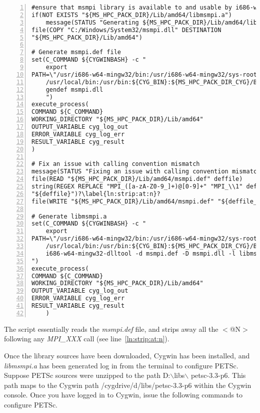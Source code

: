 \documentclass[10pt,a4paper]{article}
\newcommand{\bs}{\ensuremath{\backslash}}
\begin{document}
\begin{codeparchment}
\begin{lstlisting}[numbers=left]
#ensure that msmpi library is available to and usable by i686-w64-mingw32-gcc
if(NOT EXISTS "${MS_HPC_PACK_DIR}/Lib/amd64/libmsmpi.a")
  	message(STATUS "Generating ${MS_HPC_PACK_DIR}/Lib/amd64/libmsmpi.a")
file(COPY "C:/Windows/System32/msmpi.dll" DESTINATION
"${MS_HPC_PACK_DIR}/Lib/amd64")

# Generate msmpi.def file
set(C_COMMAND ${CYGWINBASH} -c "
	export
PATH=\"/usr/i686-w64-mingw32/bin:/usr/i686-w64-mingw32/sys-root/mingw/bin:
	/usr/local/bin:/usr/bin:${CYG_BIN}:${MS_HPC_PACK_DIR_CYG}/Bin:$PATH\"
	gendef msmpi.dll
	")
execute_process(
COMMAND ${C_COMMAND}
WORKING_DIRECTORY "${MS_HPC_PACK_DIR}/Lib/amd64"
OUTPUT_VARIABLE cyg_log_out 
ERROR_VARIABLE cyg_log_err 
RESULT_VARIABLE cyg_result
)

# Fix an issue with calling convention mismatch
message(STATUS "Fixing an issue with calling convention mismatch")
file(READ "${MS_HPC_PACK_DIR}/Lib/amd64/msmpi.def" deffile)
string(REGEX REPLACE "MPI_([a-zA-Z0-9_]+)@[0-9]+" "MPI_\\1" deffile_patch
"${deffile}")?\label{ln:strip:at:n}?	
file(WRITE "${MS_HPC_PACK_DIR}/Lib/amd64/msmpi.def" "${deffile_patch}")

# Generate libmsmpi.a
set(C_COMMAND ${CYGWINBASH} -c "
	export
PATH=\"/usr/i686-w64-mingw32/bin:/usr/i686-w64-mingw32/sys-root/mingw/bin:
	/usr/local/bin:/usr/bin:${CYG_BIN}:${MS_HPC_PACK_DIR_CYG}/Bin:$PATH\"
	i686-w64-mingw32-dlltool -d msmpi.def -D msmpi.dll -l libmsmpi.a
")
execute_process(
COMMAND ${C_COMMAND}
WORKING_DIRECTORY "${MS_HPC_PACK_DIR}/Lib/amd64"
OUTPUT_VARIABLE cyg_log_out 
ERROR_VARIABLE cyg_log_err 
RESULT_VARIABLE cyg_result
	)
\end{lstlisting}
\end{codeparchment}

The script essentially reads the \textit{msmpi.def} file, and strips away all
the $<$@N$>$ following any \textit{MPI\_XXX} call (see
line~\ref{ln:strip:at:n}). 



Once the library sources have been downloaded, Cygwin has been installed, and
\textit{libmsmpi.a} has been generated log in from the terminal to configure
PETSc. Suppose PETSc sources were unzipped to the path D:\bs libs\bs
petsc-3.3-p6. This path maps to the Cygwin path /cygdrive/d/libs/petsc-3.3-p6
within the Cygwin console. Once you have logged in to Cygwin, issue the
following commands to configure PETSc. 
\end{document}
